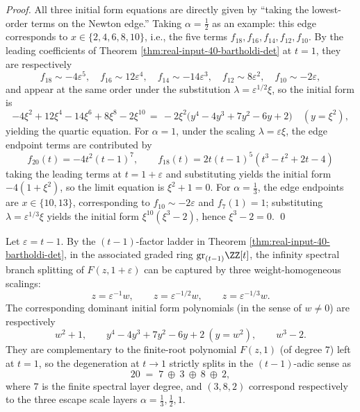 \begin{proof}
All three initial form equations are directly given by ``taking the lowest-order terms on the Newton edge.'' Taking \(\alpha=\tfrac12\) as an example:
this edge corresponds to \(x\in\{2,4,6,8,10\}\), i.e., the five terms \(f_{18},f_{16},f_{14},f_{12},f_{10}\).
By the leading coefficients of Theorem \ref{thm:real-input-40-bartholdi-det} at \(t=1\), they are respectively
\[
f_{18}\sim -4\varepsilon^5,\quad
f_{16}\sim 12\varepsilon^4,\quad
f_{14}\sim -14\varepsilon^3,\quad
f_{12}\sim 8\varepsilon^2,\quad
f_{10}\sim -2\varepsilon,
\]
and appear at the same order under the substitution \(\lambda=\varepsilon^{1/2}\xi\), so the initial form is
\[
-4\xi^2+12\xi^4-14\xi^6+8\xi^8-2\xi^{10}
\,=\,
-2\xi^2\bigl(y^4-4y^3+7y^2-6y+2\bigr)\quad(y=\xi^2),
\]
yielding the quartic equation.
For \(\alpha=1\), under the scaling \(\lambda=\varepsilon\xi\), the edge endpoint terms are contributed by
\[
f_{20}(t)=-4t^2(t-1)^7,
\qquad
f_{18}(t)=2t(t-1)^5(t^3-t^2+2t-4)
\]
taking the leading terms at \(t=1+\varepsilon\) and substituting yields the initial form \(-4(1+\xi^2)\), so the limit equation is \(\xi^2+1=0\).
For \(\alpha=\tfrac13\), the edge endpoints are \(x\in\{10,13\}\), corresponding to \(f_{10}\sim -2\varepsilon\) and \(f_7(1)=1\);
substituting \(\lambda=\varepsilon^{1/3}\xi\) yields the initial form \(\xi^{10}(\xi^3-2)\), hence \(\xi^3-2=0\).
\qed
\end{proof}

\begin{remark}\label{rem:real-input-40-bartholdi-graded-spectrum}
Let \(\varepsilon=t-1\). By the \((t-1)\)-factor ladder in Theorem \ref{thm:real-input-40-bartholdi-det}, in the associated graded ring \(\mathrm{gr}_{(t-1)}\ZZ[t]\), the infinity spectral branch splitting of \(F(z,1+\varepsilon)\) can be captured by three weight-homogeneous scalings:
\[
z=\varepsilon^{-1}w,\qquad z=\varepsilon^{-1/2}w,\qquad z=\varepsilon^{-1/3}w.
\]
The corresponding dominant initial form polynomials (in the sense of \(w\neq 0\)) are respectively
\[
w^2+1,\qquad
y^4-4y^3+7y^2-6y+2\ (y=w^2),\qquad
w^3-2.
\]
They are complementary to the finite-root polynomial \(F(z,1)\) (of degree \(7\)) left at \(t=1\), so the degeneration at \(t\to 1\) strictly splits in the \((t-1)\)-adic sense as
\[
20 \;=\; 7\ \oplus\ 3\ \oplus\ 8\ \oplus\ 2,
\]
where \(7\) is the finite spectral layer degree, and \((3,8,2)\) correspond respectively to the three escape scale layers \(\alpha=\tfrac13,\tfrac12,1\).
\end{remark}

